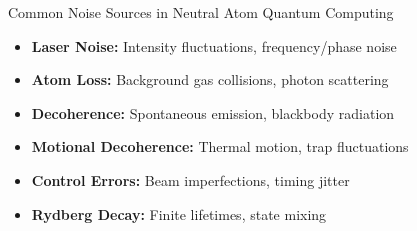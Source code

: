 \documentclass{beamer}
\begin{document}
\begin{frame}{Common Noise Sources in Neutral Atom Quantum Computing}
    \begin{itemize}
        \item \textbf{Laser Noise:} Intensity fluctuations, frequency/phase noise
        \item \textbf{Atom Loss:} Background gas collisions, photon scattering
        \item \textbf{Decoherence:} Spontaneous emission, blackbody radiation
        \item \textbf{Motional Decoherence:} Thermal motion, trap fluctuations
        \item \textbf{Control Errors:} Beam imperfections, timing jitter
        \item \textbf{Rydberg Decay:} Finite lifetimes, state mixing
    \end{itemize}
\end{frame}

\end{document}
